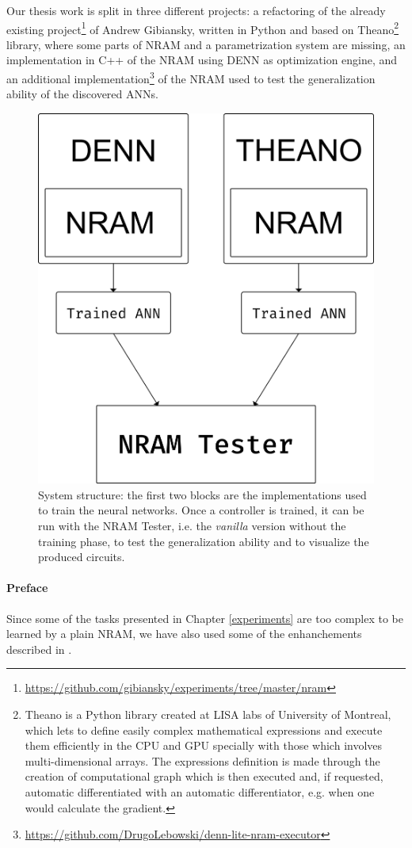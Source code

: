 \label{chap:implementation}
Our thesis work is split in three different projects: a refactoring of the already existing project\footnote{\hyperref[https://github.com/gibiansky/experiments/tree/master/nram]{https://github.com/gibiansky/experiments/tree/master/nram}} of Andrew Gibiansky, written in Python and based on Theano\footnote{Theano is a Python library created at LISA labs of University of Montreal, which lets to define easily complex mathematical expressions and execute them efficiently in the CPU and GPU specially with those which involves multi-dimensional arrays. The expressions definition is made through the creation of computational graph which is then executed and, if requested, automatic differentiated with an automatic differentiator, e.g. when one would calculate the gradient.} library, where some parts of NRAM and a parametrization system are missing, an implementation in C++ of the NRAM using DENN as optimization engine, and an additional implementation\footnote{\hyperref[https://github.com/DrugoLebowski/denn-lite-nram-executor]{https://github.com/DrugoLebowski/denn-lite-nram-executor}} of the NRAM used to test the generalization ability of the discovered ANNs.
\begin{figure}[h]
	\centering
	\includegraphics[width=0.5\linewidth]{figures/NRAM-implementation.png}
	\caption{System structure: the first two blocks are the implementations used to train the neural networks. Once a controller is trained, it can be run with the NRAM Tester, i.e. the \textit{vanilla} version without the training phase, to test the generalization ability and to visualize the produced circuits.}
	\label{fig:nram-implementation-scheme}
\end{figure}

\paragraph{Preface}
Since some of the tasks presented in Chapter \ref{experiments} are too complex to be learned by a plain NRAM, we have also used some of the enhanchements described in \cite{NRAM:2016}.

